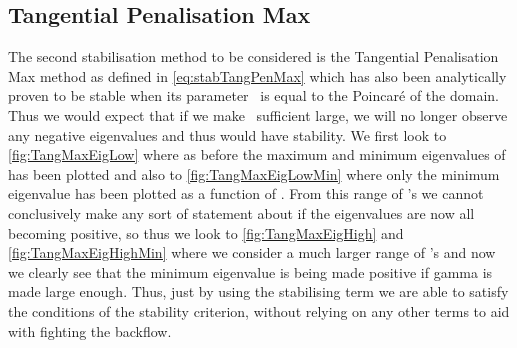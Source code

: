 \subsection{Tangential Penalisation Max}
The second stabilisation method to be considered is the Tangential Penalisation Max method as defined in \autoref{eq:stabTangPenMax} which has also been analytically proven to be stable when its parameter \mgamma~is equal to the Poincar\'{e} of the domain. Thus we would expect that if we make \mgamma~sufficient large, we will no longer observe any negative eigenvalues and thus would have stability. We first look to \autoref{fig:TangMaxEigLow} where as before the maximum and minimum eigenvalues of  has been plotted and also to \autoref{fig:TangMaxEigLowMin} where only the minimum eigenvalue has been plotted as a function of \mgamma. From this range of \mgamma's we cannot conclusively make any sort of statement about if the eigenvalues are now all becoming positive, so thus we look to \autoref{fig:TangMaxEigHigh} and \autoref{fig:TangMaxEigHighMin} where we consider a much larger range of \mgamma's and now we clearly see that the minimum eigenvalue is being made positive if gamma is made large enough. Thus, just by using the stabilising term we are able to satisfy the conditions of the stability criterion, without relying on any other terms to aid with fighting the backflow.
